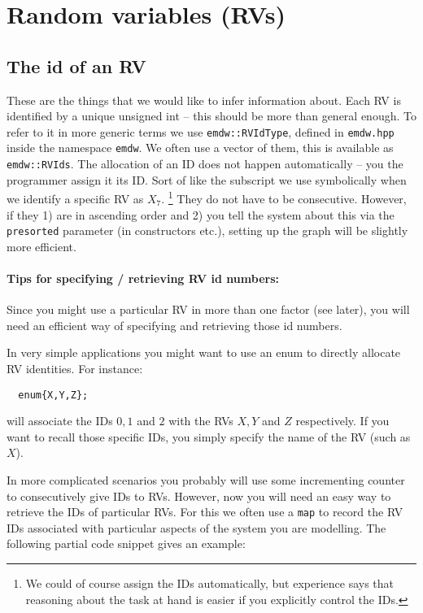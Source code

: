 \documentclass[english]{article}
\begin{document}
\section{Random variables (RVs)} \label{sec:RVs}

\subsection{The id of an RV} \label{ssec:RV_ids}

These are the things that we would like to infer information about.
Each RV is identified by a unique unsigned int -- this should be more
than general enough. To refer to it in more generic terms we use
\texttt{emdw::RVIdType}, defined in \texttt{emdw.hpp} inside the
namespace \texttt{emdw}. We often use a vector of them, this is
available as \texttt{emdw::RVIds}. The allocation of an ID does not
happen automatically -- you the programmer assign it its ID. Sort of
like the subscript we use symbolically when we identify a specific RV
as $X_{7}$.
\footnote{We could of course assign the IDs automatically, but
  experience says that reasoning about the task at hand is easier if
  you explicitly control the IDs.}
They do not have to be consecutive. However, if they 1) are
in ascending order and 2) you tell the system about this via the
\texttt{presorted} parameter (in constructors etc.), setting up the graph
will be slightly more efficient.

\paragraph{Tips for specifying / retrieving RV id numbers:}

Since you might use a particular RV in more than one factor (see
later), you will need an efficient way of specifying and retrieving
those id numbers.

In very simple applications you might want to use an
enum to directly allocate RV identities. For instance:

\begin{verbatim}
  enum{X,Y,Z};
\end{verbatim}

will associate the IDs $0,1$ and $2$ with the RVs $X, Y$ and $Z$ respectively. If
you want to recall those specific IDs, you simply specify the name of
the RV (such as $X$).

In more complicated scenarios you probably will use some incrementing
counter to consecutively give IDs to RVs. However, now you will need
an easy way to retrieve the IDs of particular RVs. For this we often
use a \texttt{map} to record the RV IDs associated with particular
aspects of the system you are modelling. The following partial code
snippet gives an example:
\end{document}
